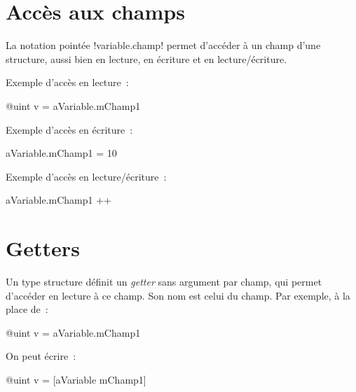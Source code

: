 \section{Accès aux champs}

La notation pointée \ggs!variable.champ! permet d'accéder à un champ d'une structure, aussi bien en lecture, en écriture et en lecture/écriture.

Exemple d'accès en lecture~:
\begin{galgas}
@uint v = aVariable.mChamp1
\end{galgas}

Exemple d'accès en écriture~:
\begin{galgas}
aVariable.mChamp1 = 10
\end{galgas}


Exemple d'accès en lecture/écriture~:
\begin{galgas}
aVariable.mChamp1 ++
\end{galgas}





\section{Getters}

Un type structure définit un \emph{getter} sans argument par champ, qui permet d'accéder en lecture à ce champ. Son nom est celui du champ. Par exemple, à la place de~:
\begin{galgas}
@uint v = aVariable.mChamp1
\end{galgas}

On peut écrire~:
\begin{galgas}
@uint v = [aVariable mChamp1]
\end{galgas}

